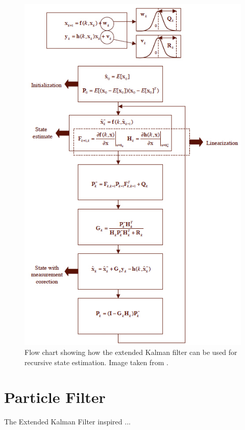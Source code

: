 \documentclass[11pt]{article}
\begin{document}
\begin{figure}[H]
\centering
\includegraphics[scale=.5]{img/ekfstateestimation.jpg}
\caption{Flow chart showing how the extended Kalman filter can be used for recursive state estimation. Image taken from \cite{kalman}.}
\label{fig:ekfstateestimation}
\end{figure}



\section{Particle Filter}
\label{sec:particlefilter}

The Extended Kalman Filter inspired ...  \\
\end{document}
